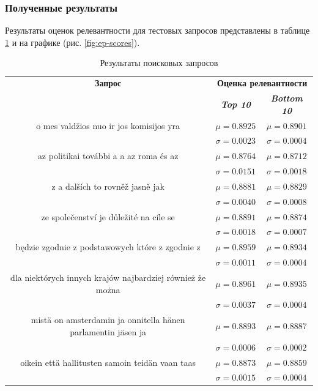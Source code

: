 \subsubsection{Полученные результаты}
Результаты оценок релевантности для тестовых запросов представлены в таблице \ref{tab8} и на графике (рис. \ref{fig:ep-scores}).

\begin{table}[tbp]
    \caption{Результаты поисковых запросов}
    \begin{center}
    \begin{tabular}{ccc}
    \toprule
    \textbf{Запрос}&\multicolumn{2}{c}{\textbf{Оценка релевантности}} \\
    & \textbf{\textit{Top 10}}& \textbf{\textit{Bottom 10}} \\
    \midrule
    o mes   valdžios nuo ir  jos komisijos yra& \(\mu=0.8925\) & \(\mu=0.8901\) \\
    & \(\sigma=0.0023\) & \(\sigma=0.0004\) \\
    \midrule
    az politikai további a  a az roma és az& \(\mu=0.8764\) & \(\mu=0.8712\) \\
    & \(\sigma=0.0151\) & \(\sigma=0.0018\) \\
    \midrule
    z a dalších  to rovněž jasně   jak& \(\mu=0.8881\) & \(\mu=0.8829\) \\
    & \(\sigma=0.0040\) & \(\sigma=0.0008\) \\
    \midrule
    ze společenství  je důležité na cíle  se& \(\mu=0.8891\) & \(\mu=0.8874\) \\
    & \(\sigma=0.0018\) & \(\sigma=0.0007\) \\
    \midrule
    będzie zgodnie z podstawowych  które z zgodnie z & \(\mu=0.8959\) & \(\mu=0.8934\) \\
    & \(\sigma=0.0011\) & \(\sigma=0.0004\) \\
    \midrule
    dla niektórych innych krajów najbardziej  również  że można & \(\mu=0.8961\) & \(\mu=0.8935\) \\
    & \(\sigma=0.0037\) & \(\sigma=0.0004\) \\
    \midrule
    mistä on amsterdamin ja onnitella hänen parlamentin jäsen ja & \(\mu=0.8893\) & \(\mu=0.8887\) \\
    & \(\sigma=0.0006\) & \(\sigma=0.0002\) \\
    \midrule
    oikein  että hallitusten samoin   teidän  vaan taas & \(\mu=0.8873\) & \(\mu=0.8859\) \\
    & \(\sigma=0.0015\) & \(\sigma=0.0004\) \\
    \bottomrule
    \end{tabular}\label{tab8}
    \end{center}
\end{table}

